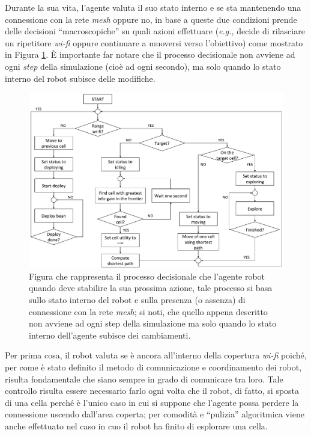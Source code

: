 Durante la sua vita, l'agente valuta il suo stato interno e se sta mantenendo una connessione con la rete \textit{mesh} oppure no, in base a queste due condizioni prende delle decisioni “macroscopiche” su quali azioni effettuare (\textit{e.g.}, decide di rilasciare un ripetitore \textit{wi-fi} oppure continuare a muoversi verso l'obiettivo) come mostrato in Figura \ref{fig:robotworkflow}.
È importante far notare che il processo decisionale non avviene ad ogni \textit{step} della simulazione (cioè ad ogni secondo), ma solo quando lo stato interno del robot subisce delle modifiche.
\begin{figure}
	\centering
	\includegraphics[width=1.0\linewidth]{images/Robot_workflow}
	\caption{Figura che rappresenta il processo decisionale che l'agente robot quando deve stabilire la sua prossima azione, tale processo si basa sullo stato interno del robot e sulla presenza (o assenza) di connessione con la rete \textit{mesh}; si noti, che quello appena descritto non avviene ad ogni step della simulazione ma solo quando lo stato interno dell'agente subisce dei cambiamenti.}
	\label{fig:robotworkflow}
\end{figure}
Per prima cosa, il robot valuta se è ancora all'interno della copertura \textit{wi-fi} poiché, per come è stato definito il metodo di comunicazione e coordinamento dei robot, risulta fondamentale che siano sempre in grado di comunicare tra loro.
Tale controllo risulta essere necessario farlo ogni volta che il robot, di fatto, si sposta di una cella perché è l'unico caso in cui si suppone che l'agente possa perdere la connessione uscendo dall'area coperta; per comodità e “pulizia” algoritmica viene anche effettuato nel caso in cuo il robot ha finito di esplorare una cella.
